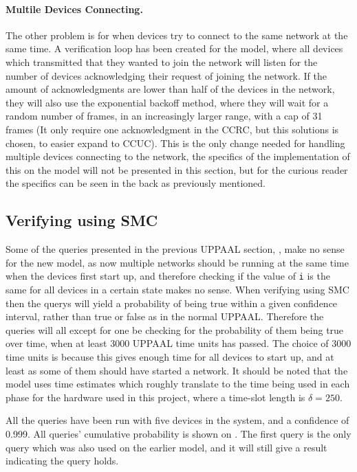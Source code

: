 \paragraph{Multile Devices Connecting.}
The other problem is for when devices try to connect to the same network at the same time.
A verification loop has been created for the model, where all devices which transmitted that they wanted to join the network will listen for the number of devices acknowledging their request of joining the network.
If the amount of acknowledgments are lower than half of the devices in the network, they will also use the exponential backoff method, where they will wait for a random number of frames, in an increasingly larger range, with a cap of 31 frames (It only require one acknowledgment in the CCRC, but this solutions is chosen, to easier expand to CCUC).
This is the only change needed for handling multiple devices connecting to the network, the specifics of the implementation of this on the model will not be presented in this section, but for the curious reader the specifics can be seen in the back as previously mentioned.


\subsection*{Verifying using SMC}

Some of the queries presented in the previous UPPAAL section, , make no sense for the new model, as now multiple networks should be running at the same time when the devices first start up, and therefore checking if the value of \texttt{i} is the same for all devices in a certain state makes no sense.
When verifying using SMC then the querys will yield a probability of being true within a given confidence interval, rather than true or false as in the normal UPPAAL.
Therefore the queries will all except for one be checking for the probability of them being true over time, when at least 3000 UPPAAL time units has passed.
The choice of 3000 time units is because this gives enough time for all devices to start up, and at least as some of them should have started a network. 
It should be noted that the model uses time estimates which roughly translate to the time being used in each phase for the hardware used in this project, where a time-slot length is $\delta = 250$.

All the queries have been run with five devices in the system, and a confidence of 0.999.
All queries' cumulative probability is shown on .
The first query is the only query which was also used on the earlier model, and it will still give a result indicating the query holds.

